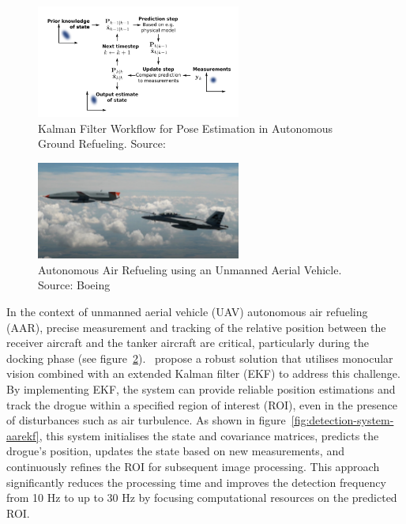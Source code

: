\documentclass[12pt,oneside]{book} %
\begin{document}
\begin{figure}[H]
    \centering
    \includegraphics[width=0.6\textwidth]{figures/AGRPoseKalman.png}
    \caption{Kalman Filter Workflow for Pose Estimation in Autonomous Ground Refueling. Source: \citet{AGRPoseEstimation}}\label{fig:agr-pose-kalman}
\end{figure}

\begin{figure}[H]
    \centering
    \includegraphics[width=0.6\textwidth]{figures/aerial_refuelling.jpg}
    \caption{Autonomous Air Refueling using an Unmanned Aerial Vehicle. Source: Boeing}\label{fig:aerial-refuelling}
\end{figure}

In the context of unmanned aerial vehicle (UAV) autonomous air refueling (AAR),
precise measurement and tracking of the relative position between the receiver
aircraft and the tanker aircraft are critical, particularly during the docking
phase (see figure~\ref{fig:aerial-refuelling}).~\citet{AAREKF} propose a robust
solution that utilises monocular vision combined with an extended Kalman filter
(EKF) to address this challenge. By implementing EKF, the system can provide
reliable position estimations and track the drogue within a specified region of
interest (ROI), even in the presence of disturbances such as air turbulence. As
shown in figure~\ref{fig:detection-system-aarekf}, this system initialises the
state and covariance matrices, predicts the drogue's position, updates the
state based on new measurements, and continuously refines the ROI for
subsequent image processing. This approach significantly reduces the processing
time and improves the detection frequency from 10 Hz to up to 30 Hz by focusing
computational resources on the predicted ROI. 
\end{document}
